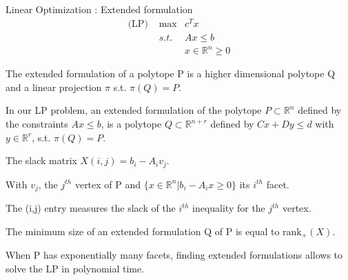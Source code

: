 \begin{frame}{Linear Optimization : Extended formulation}
\begin{align*}
\text{(LP) } & \max & c^T x\\
 &s.t. & Ax\leq b\\
 & & x \in \mathbb{R}^n \geq 0
\end{align*}
\begin{defn}
The extended formulation of a polytope P is a higher dimensional polytope Q and a linear projection $\pi$ s.t. $\pi(Q) = P$.
\end{defn}
In our LP problem, an extended formulation of the polytope $P \subset \mathbb{R}^n$ defined by the constraints $Ax\leq b$, is a polytope $Q\subset \mathbb{R}^{n+r}$ defined by $Cx+Dy \leq d$ with $y\in \mathbb{R}^r$, s.t. $\pi(Q) = P$.

\end{frame}

\begin{frame}
The slack matrix $X(i,j) = b_i-A_iv_j$.

With $v_j$, the $j^{th}$ vertex of P and $\{x\in \mathbb{R}^n | b_i-A_ix\geq 0\}$ its $i^{th}$ facet.

The (i,j) entry measures the slack of the $i^{th}$ inequality for the $j^{th}$ vertex. 
\begin{thm}[Yannakis]
The minimum size of an extended formulation Q of P is equal to $\text{rank}_+(X)$.
\end{thm}

When P has exponentially many facets, finding extended formulations allows to solve the LP in polynomial time.
\end{frame}